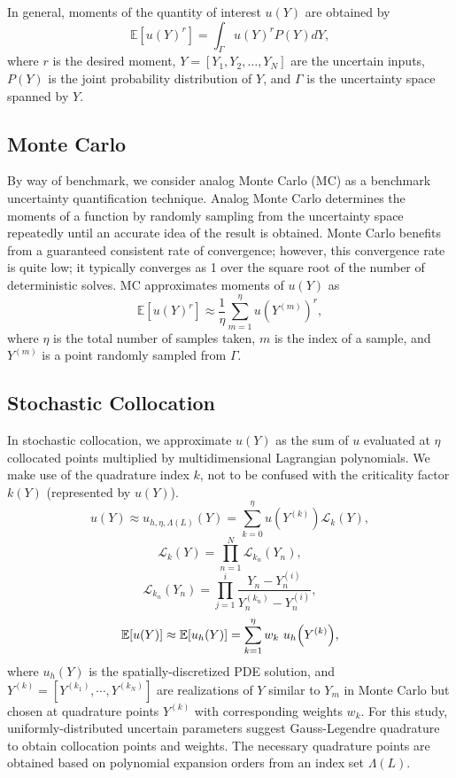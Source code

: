 \documentclass{mc2015}
\newcommand{\expv}[1]{\ensuremath{\mathbb{E}[ #1]}}
\begin{document}
In general, moments of the quantity of interest $u(Y)$ are obtained by
\begin{equation}
\expv{u(Y)^r} = \int_\Gamma u(Y)^r P(Y) dY,
\end{equation}
where $r$ is the desired moment, $Y=[Y_1,Y_2,\ldots,Y_N]$ are the uncertain inputs, $P(Y)$ is the joint probability distribution of $Y$, and $\Gamma$ is the uncertainty space spanned by $Y$.

\subsection{Monte Carlo}
By way of benchmark, we consider analog Monte Carlo (MC) as a benchmark uncertainty quantification technique.
Analog Monte Carlo determines the moments of a function by randomly sampling from the uncertainty space repeatedly until an accurate idea of the result is obtained.  Monte Carlo benefits from a guaranteed consistent rate of convergence; however, this convergence rate is quite low; it typically converges as 1 over the square root of the number of deterministic solves.
MC approximates moments of $u(Y)$ as
\begin{equation}
\expv{u(Y)^r}\approx \frac{1}{\eta}\sum_{m=1}^\eta u(Y^{(m)})^r,
\end{equation}
where $\eta$ is the total number of samples taken, $m$ is the index of a sample, and $Y^{(m)}$ is a point randomly sampled from $\Gamma$.


\subsection{Stochastic Collocation}
In stochastic collocation, we approximate $u(Y)$ as the sum of $u$ evaluated at $\eta$ collocated points multiplied by multidimensional Lagrangian polynomials.  We make use of the quadrature index $k$, not to be confused with the criticality factor $k(Y)$ (represented by $u(Y)$).
\begin{equation}\label{approx}
u(Y)\approx u_{h,\eta,\Lambda(L)}(Y)=\sum_{k=0}^\eta u(Y^{(k)})\mathcal{L}_k(Y),
\end{equation}
\begin{equation}
\mathcal{L}_k(Y)=\prod_{n=1}^N \mathcal{L}_{k_n}(Y_n),
\end{equation}
\begin{equation}
\mathcal{L}_{k_n}(Y_n)=\prod_{j=1}^i \frac{Y_n-Y_n^{(i)}}{Y_n^{(k_n)}-Y_n^{(i)}},
\end{equation}
\begin{equation}
\expv{u(Y)}\approx\expv{u_h(Y)}=\sum_{k=1}^\eta w_k ~u_h\qty(Y^{(k)}),
\end{equation}
where $u_h(Y)$ is the spatially-discretized PDE solution, and $Y^{(k)}=[Y^{(k_1)},\cdots,Y^{(k_N)}]$ are realizations of $Y$ similar to $Y_m$ in Monte Carlo but chosen at quadrature points $Y^{(k)}$ with corresponding weights $w_k$.  For this study, uniformly-distributed uncertain parameters suggest Gauss-Legendre quadrature to obtain collocation points and weights.  The necessary quadrature points are obtained based on polynomial expansion orders from an index set $\Lambda(L)$.
\end{document}
